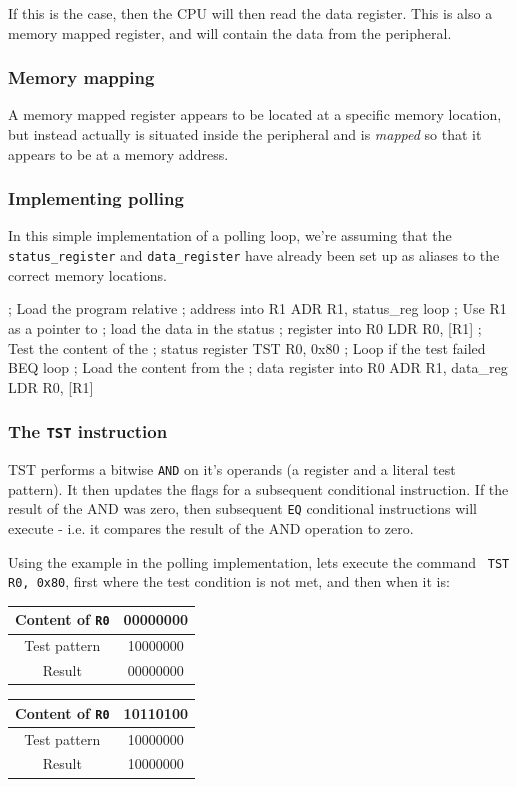 If this is the case, then the CPU will then read the data register. This is also
a memory mapped register, and will contain the data from the peripheral.

\subsubsection{Memory mapping}
A memory mapped register appears to be located at a specific memory location,
but instead actually is situated inside the peripheral and is {\it mapped} so
that it appears to be at a memory address.

\subsubsection{Implementing polling}

In this simple implementation of a polling loop, we're assuming that the {\tt
status\_register} and {\tt data\_register} have already been set up as aliases
to the correct memory locations.

\begin{listing}{1}
	; Load the program relative
	; address into R1
	ADR	R1, status_reg
loop
	; Use R1 as a pointer to
	; load the data in the status
	; register into R0
	LDR	R0, [R1]
	; Test the content of the
	; status register
	TST	R0, 0x80
	; Loop if the test failed
	BEQ	loop
	; Load the content from the
	; data register into R0
	ADR	R1, data_reg
	LDR	R0, [R1]
\end{listing}

\subsubsection{The {\tt TST} instruction}

TST performs a bitwise {\tt AND} on it's operands (a register and a literal test
pattern). It then updates the flags for a subsequent conditional instruction. If
the result of the AND was zero, then subsequent {\tt EQ} conditional
instructions will execute - i.e. it compares the result of the AND operation to
zero.

Using the example in the polling implementation, lets execute the command {\tt
TST R0, 0x80}, first where the test condition is not met, and then when it is:

\begin{center}
	\begin{tabular}{c|c}
		Content of {\tt R0} & 00000000\\ \hline
		Test pattern & 10000000\\ \hline
		Result & 00000000\\ \hline
	\end{tabular}

	\begin{tabular}{c|c}
		Content of {\tt R0} & 10110100\\ \hline
		Test pattern & 10000000\\ \hline
		Result & 10000000\\ \hline
	\end{tabular}
\end{center}

